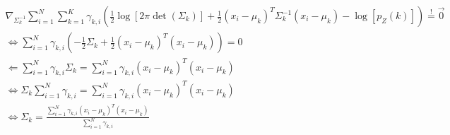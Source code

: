 \documentclass[12pt,paper=a4,twoside]{scrartcl}
\begin{document}
\begin{gather*}
\nabla_{\Sigma_k^{-1}} \sum_{i=1}^N \sum_{k=1}^K \gamma_{k,i} \left(\frac{1}{2}\log[2\pi \det(\Sigma_k)] + \frac{1}{2} (x_i - \mu_k)^T \Sigma_k^{-1} (x_i - \mu_k) - \log[p_Z(k)]\right) \stackrel{!}{=} \vec{0}\\
\Leftrightarrow\sum_{i=1}^N  \gamma_{k,i} \left(-\frac{1}{2}\Sigma_k + \frac{1}{2} (x_i - \mu_k)^T (x_i - \mu_k)\right) = 0\\
\Leftarrow\sum_{i=1}^N  \gamma_{k,i} \Sigma_k = \sum_{i=1}^N  \gamma_{k,i} (x_i - \mu_k)^{T} (x_i - \mu_k)\\
\Leftrightarrow \Sigma_k \sum_{i=1}^N  \gamma_{k,i} = \sum_{i=1}^N  \gamma_{k,i} (x_i - \mu_k)^{T} (x_i - \mu_k)\\
\Leftrightarrow \Sigma_k = \frac{\sum_{i=1}^N  \gamma_{k,i} (x_i - \mu_k)^{T} (x_i - \mu_k)}{\sum_{i=1}^N  \gamma_{k,i}}
\end{gather*}
\end{document}
